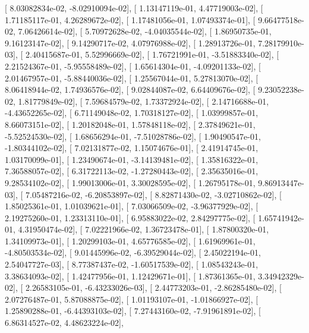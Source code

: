 \documentclass{article}
\begin{document}
       [  8.03082834e-02,  -8.02910094e-02],
       [  1.13147119e-01,   4.47719003e-02],
       [  1.71185117e-01,   4.26289672e-02],
       [  1.17481056e-01,   1.07493374e-01],
       [  9.66477518e-02,   7.06426614e-02],
       [  5.70972628e-02,  -4.04035544e-02],
       [  1.86950735e-01,   9.16123147e-02],
       [  9.14290717e-02,   4.07976988e-02],
       [  1.28913726e-01,   7.28179910e-03],
       [  2.40415687e-01,   5.52996669e-02],
       [  1.76721991e-01,  -3.51883340e-02],
       [  2.21524367e-01,  -5.95558489e-02],
       [  1.65614304e-01,  -4.09201133e-02],
       [  2.01467957e-01,  -5.88440036e-02],
       [  1.25567044e-01,   5.27813070e-02],
       [  8.06418944e-02,   1.74936576e-02],
       [  9.02844087e-02,   6.64409676e-02],
       [  9.23052238e-02,   1.81779849e-02],
       [  7.59684579e-02,   1.73372924e-02],
       [  2.14716688e-01,  -4.43652265e-02],
       [  6.71149048e-02,   1.70318127e-02],
       [  1.03999857e-01,   8.66073151e-02],
       [  1.20182048e-01,   1.57848118e-02],
       [  2.37849621e-01,  -5.52524530e-02],
       [  1.68656294e-01,  -7.51028786e-02],
       [  1.90490547e-01,  -1.80344102e-02],
       [  7.02131877e-02,   1.15074676e-01],
       [  2.41914745e-01,   1.03170099e-01],
       [  1.23490674e-01,  -3.14139481e-02],
       [  1.35816322e-01,   7.36588057e-02],
       [  6.31722113e-02,  -1.27280443e-02],
       [  2.35635016e-01,   9.28534102e-02],
       [  1.99013006e-01,   3.30028595e-02],
       [  1.26795178e-01,   9.86913447e-03],
       [  7.05487216e-02,  -6.20853897e-02],
       [  8.82871430e-02,  -3.02710862e-02],
       [  1.85025361e-01,   1.01039621e-01],
       [  7.03066509e-02,  -3.96377929e-02],
       [  2.19275260e-01,   1.23313110e-01],
       [  6.95883022e-02,   2.84297775e-02],
       [  1.65741942e-01,   4.31950474e-02],
       [  7.02221966e-02,   1.36723478e-01],
       [  1.87800320e-01,   1.34109973e-01],
       [  1.20299103e-01,   4.65776585e-02],
       [  1.61969961e-01,  -4.80503534e-02],
       [  9.01445996e-02,  -6.39529044e-02],
       [  2.45022194e-01,   2.54047727e-03],
       [  8.77387437e-02,  -1.60517539e-02],
       [  1.08543243e-01,   3.38634093e-02],
       [  1.42477956e-01,   1.12429671e-01],
       [  1.87361365e-01,   3.34942329e-02],
       [  2.26583105e-01,  -6.43233026e-03],
       [  2.44773203e-01,  -2.86285480e-02],
       [  2.07276487e-01,   5.87088875e-02],
       [  1.01193107e-01,  -1.01866927e-02],
       [  1.25890288e-01,  -6.44393103e-02],
       [  7.27443160e-02,  -7.91961891e-02],
       [  6.86314527e-02,   4.48623224e-02],
\end{document}
